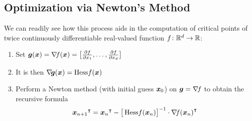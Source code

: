 \subsection{Optimization via Newton's Method}
We can readily see how this process aids in the computation of critical points of twice continuously differentiable real-valued function $f\colon \mathbb{R}^d \to \mathbb{R}$:
\begin{enumerate}
	\item Set $\boldsymbol{g}(\boldsymbol{x}) = \mathop{\nabla\! {f}}(\boldsymbol{x}) = \big[ \frac{\partial f}{\partial x_1}, \dotsc, \frac{\partial f}{\partial x_d} \big]$
	\item It is then $\mathop{\nabla\! {\boldsymbol{g}}}(\boldsymbol{x}) = \mathop{\mathrm{Hess}{f}}(\boldsymbol{x})$
	\item Perform a Newton method (with initial guess $\boldsymbol{x}_0$) on $\boldsymbol{g}=\mathop{\nabla\! {f}}$ to obtain the recursive formula
	\begin{equation}\label{equation:Newton4Crit}
	{\boldsymbol{x}_{n+1}}^\intercal = {\boldsymbol{x}_n}^\intercal - \big[ \mathop{\mathrm{Hess}{f}}(\boldsymbol{x}_n) \big]^{-1} \cdot {\mathop{\nabla\! {f}}(\boldsymbol{x}_n)}^\intercal
	\end{equation}
\end{enumerate}


